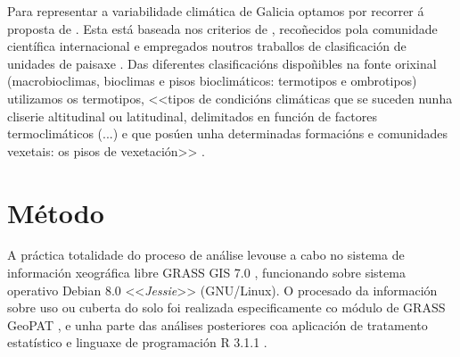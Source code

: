 \documentclass[11pt,a4paper]{article}
\begin{document}
Para representar a variabilidade climática de Galicia optamos por recorrer á proposta de \citet{Rodriguez2007}. Esta está baseada nos criterios de \citet{RivasMartinez2015}, recoñecidos pola comunidade científica internacional e empregados noutros traballos de clasificación de unidades de paisaxe \citep[p.ex. ][]{Capotorti2012174}. Das diferentes clasificacións dispoñibles na fonte orixinal (macrobioclimas, bioclimas e pisos bioclimáticos: termotipos e ombrotipos) utilizamos os termotipos, <<tipos de condicións climáticas que se suceden nunha cliserie altitudinal ou latitudinal, delimitados en función de factores termoclimáticos (...) e que posúen unha determinadas formacións e comunidades vexetais: os pisos de vexetación>> \citep{RivasMartinez2015}. 






\section{Método}

A práctica totalidade do proceso de análise levouse a cabo no sistema de información xeográfica libre GRASS GIS 7.0 \citep{GRASS7}, funcionando sobre sistema operativo Debian 8.0 <<\emph{Jessie}>> (GNU/Linux). O procesado da información sobre uso ou cuberta do solo foi realizada especificamente co módulo de GRASS GeoPAT \citep[\emph{Geospatial Pattern Analysis Toolbox},][]{Jasiewicz201562}, e unha parte das análises posteriores coa aplicación de tratamento estatístico e linguaxe de programación R 3.1.1 \citep{R}.%
\end{document}
